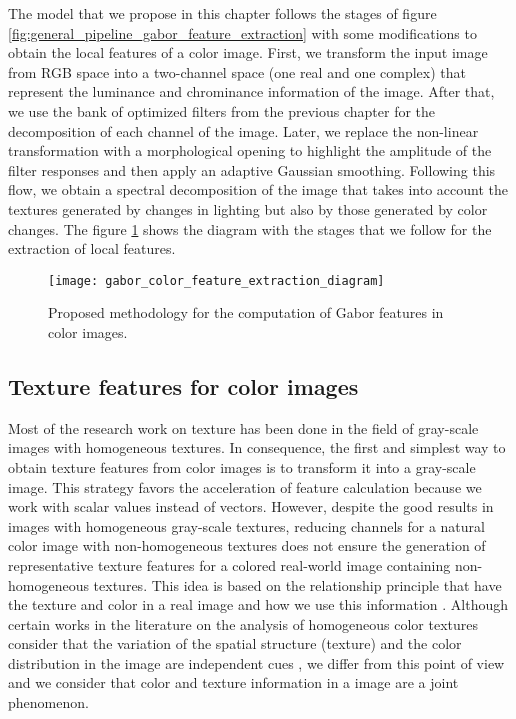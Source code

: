 The model that we propose in this chapter follows the stages of figure \ref{fig:general_pipeline_gabor_feature_extraction} with some modifications to obtain the local features of a color image. First, we transform the input image from RGB space into a two-channel space (one real and one complex) that represent the luminance and chrominance information of the image. After that, we use the bank of optimized filters from the previous chapter for the decomposition of each channel of the image. Later, we replace the non-linear transformation with a morphological opening to highlight the amplitude of the filter responses and then apply an adaptive Gaussian smoothing. Following this flow, we obtain a spectral decomposition of the image that takes into account the textures generated by changes in lighting but also by those generated by color changes. The figure \ref{fig:proposed_pipeline_gabor_feature_extraction} shows the diagram with the stages that we follow for the extraction of local features.

\begin{figure}[!ht]
	\centering
	\texttt{[image: gabor\_color\_feature\_extraction\_diagram]}
	\caption{Proposed methodology for the computation of Gabor features in color images.}\label{fig:proposed_pipeline_gabor_feature_extraction}
\end{figure}


\subsection{Texture features for color images}
Most of the research work on texture has been done in the field of gray-scale images with homogeneous textures. In consequence, the first and simplest way to obtain texture features from color images is to transform it into a gray-scale image. This strategy favors the acceleration of feature calculation because we work with scalar values instead of vectors. However, despite the good results in images with homogeneous gray-scale textures, reducing channels for a natural color image with non-homogeneous textures does not ensure the generation of representative texture features for a colored real-world image containing non-homogeneous textures. This idea is based on the relationship principle that have the texture and color in a real image and how we use this information \citep{Maenpaa.Pietikainen:PR:2004}. Although certain works in the literature on the analysis of homogeneous color textures consider that the variation of the spatial structure (texture) and the color distribution in the image are independent cues \citep{Permuter.Francos.ea:PR:2006}, we differ from this point of view and we consider that color and texture information in a image are a joint phenomenon.

